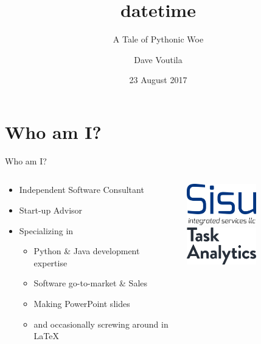\documentclass[10pt]{beamer}
\title[datetime]{datetime}
\subtitle{A Tale of Pythonic Woe}
\author{Dave Voutila}
\institute{
	voutilad@gmail.com \\
	https://github.com/voutilad \\
	@voutilad
}
\date{23 August 2017}
\newif\ifplacelogo %
\begin{document}
\maketitle

\section{Who am I?}
\begin{frame}{Who am I?}
	\begin{columns}
		\begin{column}{0.5 \textwidth}
			\begin{itemize}
				\item Independent Software Consultant
				\item Start-up Advisor
				\item Specializing in
					\begin{itemize}
						\item Python \& Java development expertise
						\item Software go-to-market \& Sales
						\item Making PowerPoint slides
				\item and occasionally screwing around in \LaTeX
					\end{itemize}
			\end{itemize}
		\end{column}
		\begin{column}{0.5 \textwidth}
			\centering
			\includegraphics[width=3cm]{images/sisu.png}
			\vspace{1cm}
			\includegraphics[width=3cm]{images/ta.png}
		\end{column}
	\end{columns}
\end{frame}

\placelogofalse
\end{document}

